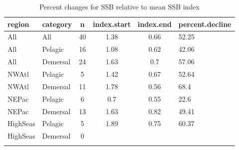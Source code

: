 \begin{longtable}{p{4cm}p{3.5cm}cccp{5.5cm}}
  \hline
region & category & n & index.start & index.end & percent.decline \\ 
  \hline
All & All & 40 & 1.38 & 0.66 & 52.25 \\ 
  All & Pelagic & 16 & 1.08 & 0.62 & 42.06 \\ 
  All & Demersal & 24 & 1.63 & 0.7 & 57.06 \\ 
  NWAtl & Pelagic & 5 & 1.42 & 0.67 & 52.64 \\ 
  NWAtl & Demersal & 11 & 1.78 & 0.56 & 68.4 \\ 
  NEPac & Pelagic & 6 & 0.7 & 0.55 & 22.6 \\ 
  NEPac & Demersal & 13 & 1.63 & 0.82 & 49.41 \\ 
  HighSeas & Pelagic & 5 & 1.89 & 0.75 & 60.37 \\ 
  HighSeas & Demersal & 0 &  &  &  \\ 
   \hline
\hline
\caption{Percent changes for SSB relative to mean SSB index}
\label{tab:orig:perc}
\end{longtable}
